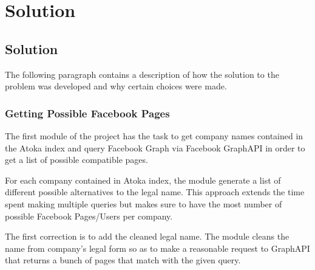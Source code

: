 \chapter{Solution} 

\section{Solution}
The following paragraph contains a description of how the solution to the problem was developed and why certain choices were made.

\subsection{Getting Possible Facebook Pages}

The first module of the project has the task to get company names contained in the Atoka index and query Facebook Graph via Facebook GraphAPI in order to get a list of possible compatible pages.

For each company contained in Atoka index, the module generate a list of different possible alternatives to the legal name. This approach extends the time spent making multiple queries but makes sure to have the most number of possible Facebook Pages/Users per company. 

The first correction is to add the cleaned legal name. The  module cleans the name from company's legal form so as to make a reasonable request to GraphAPI that returns a bunch of pages that match with the given query.

